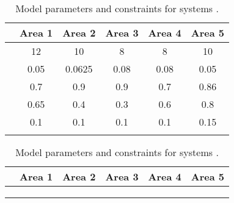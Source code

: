 \documentclass[a4paper]{article}
\begin{document}
          \begin{table}[!ht]
            \centering
            \begin{tabular}{|c|c|c|c|c|c|}
              \hline
              &  Area 1 & Area 2 & Area 3 & Area 4 & Area 5 \\
              \hline
                   &  12       & 10        &  8        &  8        & 10         \\
              \hline
                   &   0.05   & 0.0625 & 0.08    &  0.08   &  0.05    \\
              \hline
                   &  0.7      & 0.9      & 0.9      &  0.7     &  0.86     \\
              \hline
               &   0.65    & 0.4      & 0.3      &  0.6     &  0.8       \\
              \hline
               &  0.1      & 0.1      & 0.1      &  0.1     &   0.15    \\
              \hline
              \multicolumn{6}{c}{}                                                          \\
            \end{tabular}
            
            \begin{tabular}{|c|c|c|c|c|c|}
              \hline
              &  Area 1 & Area 2 & Area 3 & Area 4 & Area 5 \\
              \hline
                  &     &     &   &      &      \\
              \hline
                  &     &     &   &      &      \\
              \hline 
              \multicolumn{6}{c}{}\\
            \end{tabular}
            
            \\                
            
            \caption{Model parameters and constraints for systems .}
            \label{tab:scenario123}
          \end{table} 


          
\end{document}
